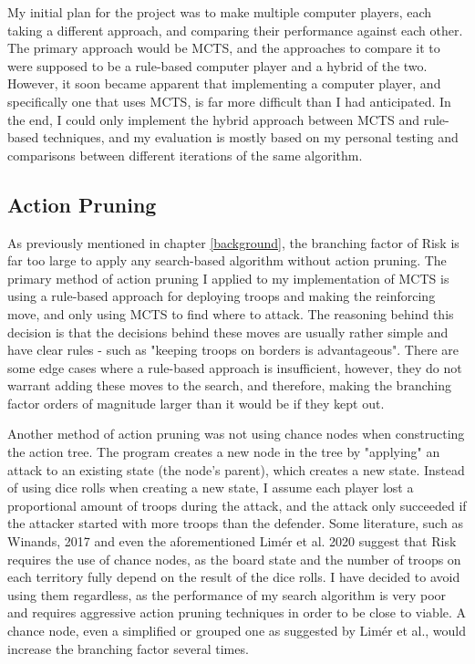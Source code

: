 My initial plan for the project was to make multiple computer players, each taking a different approach, and comparing their performance against each other. The primary approach would be MCTS, and the approaches to compare it to were supposed to be a rule-based computer player and a hybrid of the two. However, it soon became apparent that implementing a computer player, and specifically one that uses MCTS, is far more difficult than I had anticipated. In the end, I could only implement the hybrid approach between MCTS and rule-based techniques, and my evaluation is mostly based on my personal testing and comparisons between different iterations of the same algorithm.

\subsection{Action Pruning}
\label{actionPruning}

As previously mentioned in chapter \ref{background}, the branching factor of Risk is far too large to apply any search-based algorithm without action pruning. The primary method of action pruning I applied to my implementation of MCTS is using a rule-based approach for deploying troops and making the reinforcing move, and only using MCTS to find where to attack. The reasoning behind this decision is that the decisions behind these moves are usually rather simple and have clear rules - such as "keeping troops on borders is advantageous". There are some edge cases where a rule-based approach is insufficient, however, they do not warrant adding these moves to the search, and therefore, making the branching factor orders of magnitude larger than it would be if they kept out.

Another method of action pruning was not using chance nodes when constructing the action tree. The program creates a new node in the tree by "applying" an attack to an existing state (the node's parent), which creates a new state. Instead of using dice rolls when creating a new state, I assume each player lost a proportional amount of troops during the attack, and the attack only succeeded if the attacker started with more troops than the defender. Some literature, such as Winands, 2017 \cite{winands2017monte} and even the aforementioned Lim{\'e}r et al. 2020 \cite{limer2020monte} suggest that Risk requires the use of chance nodes, as the board state and the number of troops on each territory fully depend on the result of the dice rolls. I have decided to avoid using them regardless, as the performance of my search algorithm is very poor and requires aggressive action pruning techniques in order to be close to viable. A chance node, even a simplified or grouped one as suggested by Lim{\'e}r et al., would increase the branching factor several times.

